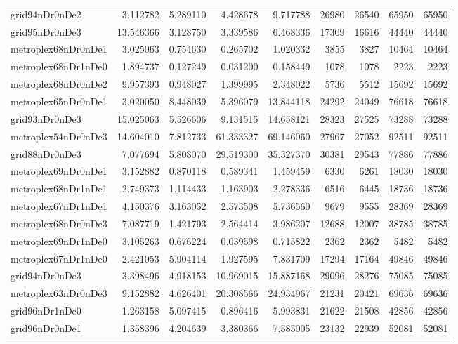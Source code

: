 \begin{longtable}{|l|r|r|r|r|r|r|r|r|}
grid94nDr0nDe2 & 3.112782 & 5.289110 & 4.428678 & 9.717788 & 26980 & 26540 & 65950 & 65950 \\
grid95nDr0nDe3 & 13.546366 & 3.128750 & 3.339586 & 6.468336 & 17309 & 16616 & 44440 & 44440 \\
metroplex68nDr0nDe1 & 3.025063 & 0.754630 & 0.265702 & 1.020332 & 3855 & 3827 & 10464 & 10464 \\
metroplex68nDr1nDe0 & 1.894737 & 0.127249 & 0.031200 & 0.158449 & 1078 & 1078 & 2223 & 2223 \\
metroplex68nDr0nDe2 & 9.957393 & 0.948027 & 1.399995 & 2.348022 & 5736 & 5512 & 15692 & 15692 \\
metroplex65nDr0nDe1 & 3.020050 & 8.448039 & 5.396079 & 13.844118 & 24292 & 24049 & 76618 & 76618 \\
grid93nDr0nDe3 & 15.025063 & 5.526606 & 9.131515 & 14.658121 & 28323 & 27525 & 73288 & 73288 \\
metroplex54nDr0nDe3 & 14.604010 & 7.812733 & 61.333327 & 69.146060 & 27967 & 27052 & 92511 & 92511 \\
grid88nDr0nDe3 & 7.077694 & 5.808070 & 29.519300 & 35.327370 & 30381 & 29543 & 77886 & 77886 \\
metroplex69nDr0nDe1 & 3.152882 & 0.870118 & 0.589341 & 1.459459 & 6330 & 6261 & 18030 & 18030 \\
metroplex68nDr1nDe1 & 2.749373 & 1.114433 & 1.163903 & 2.278336 & 6516 & 6445 & 18736 & 18736 \\
metroplex67nDr1nDe1 & 4.150376 & 3.163052 & 2.573508 & 5.736560 & 9679 & 9555 & 28369 & 28369 \\
metroplex68nDr0nDe3 & 7.087719 & 1.421793 & 2.564414 & 3.986207 & 12688 & 12007 & 38785 & 38785 \\
metroplex69nDr1nDe0 & 3.105263 & 0.676224 & 0.039598 & 0.715822 & 2362 & 2362 & 5482 & 5482 \\
metroplex67nDr1nDe0 & 2.421053 & 5.904114 & 1.927595 & 7.831709 & 17294 & 17164 & 49846 & 49846 \\
grid94nDr0nDe3 & 3.398496 & 4.918153 & 10.969015 & 15.887168 & 29096 & 28276 & 75085 & 75085 \\
metroplex63nDr0nDe3 & 9.152882 & 4.626401 & 20.308566 & 24.934967 & 21231 & 20421 & 69636 & 69636 \\
grid96nDr1nDe0 & 1.263158 & 5.097415 & 0.896416 & 5.993831 & 21622 & 21508 & 42856 & 42856 \\
grid96nDr0nDe1 & 1.358396 & 4.204639 & 3.380366 & 7.585005 & 23132 & 22939 & 52081 & 52081 \\

\end{longtable}
